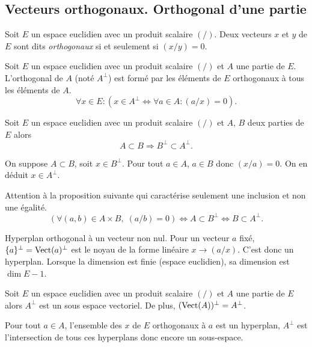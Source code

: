 \subsection{Vecteurs orthogonaux. Orthogonal d'une partie}
\begin{defi} 
 Soit $E$ un espace euclidien avec un produit scalaire $(/)$. Deux vecteurs $x$ et $y$ de $E$ sont dits \emph{orthogonaux} si et seulement si $(x/y)=0$.
\end{defi}
\begin{defi}
 Soit $E$ un espace euclidien avec un produit scalaire $(/)$ et $A$ une partie de $E$. L'orthogonal de $A$ (noté $A^\bot$) est formé par les éléments de $E$ orthogonaux à tous les éléments de $A$.
\begin{displaymath}
 \forall x\in E : \left( x\in A^\bot \Leftrightarrow
\forall a\in A : (a/x)=0 \right) .
\end{displaymath}
\end{defi}
\begin{prop}
 Soit $E$ un espace euclidien avec un produit scalaire $(/)$ et $A$, $B$ deux parties de $E$ alors 
\begin{displaymath}
 A \subset B \Rightarrow B^\bot \subset A^\bot .
\end{displaymath}
\end{prop}
\begin{demo}
On suppose $A \subset B$, soit $x\in B^\bot$. Pour tout $a\in A$, $a\in B$ donc $(x/a)=0$. On en déduit $x \in A^\bot$.
\end{demo}
\begin{rem}
 Attention à la proposition suivante qui caractérise seulement une inclusion et non une égalité.
\[
 \left(  \forall (a,b) \in A\times B,\; (a/b) = 0\right) \Leftrightarrow A \subset B^\bot \Leftrightarrow B \subset A^\bot. 
\]
\end{rem}

\begin{defi}
Hyperplan orthogonal à un vecteur non nul. Pour un vecteur $a$ fixé, $\{a\}^{\bot}=\mathop{\mathrm{Vect}}(a)^\bot$ est le noyau de la forme linéaire $x\rightarrow (a/x)$. C'est donc un hyperplan. Lorsque la dimension est finie (espace euclidien), sa dimension est $\dim E -1$.  
\end{defi}

\begin{prop}
 Soit $E$ un espace euclidien avec un produit scalaire $(/)$ et $A$ une partie de $E$ alors $A^\bot$ est un sous espace vectoriel. De plus, $(\mathop{\mathrm{Vect}}(A))^\bot = A^\bot$.
\end{prop}
\begin{demo}
Pour tout $a\in A$, l'ensemble des $x$ de $E$ orthogonaux à $a$ est un hyperplan, $A^\bot$ est l'intersection de tous ces hyperplans donc encore un sous-espace.
\end{demo}


